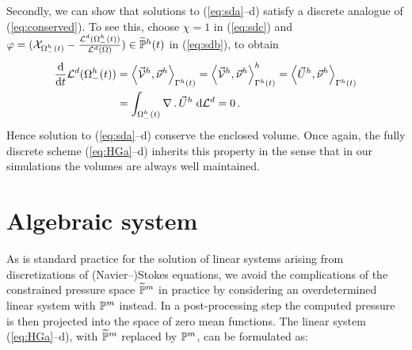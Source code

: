 Secondly, we can show that solutions to (\ref{eq:sda}--d) satisfy a discrete
analogue of (\ref{eq:conserved}). To see this, choose $\chi = 1$ in
(\ref{eq:sdc}) and $\varphi= (\mathrm{\mathcal{X}}_{\Omega_-^h(t)} -
\frac{\mathcal{L}^d(\Omega_-^h(t))}{\mathcal{L}^d(\Omega)})
\in \widetilde{\mathbb{P}}^h(t)$ in (\ref{eq:sdb}), to obtain
\begin{align}\label{eq:stokes_volume_semidiscrete}
\frac{\rm d}{{\rm d}t} \mathcal{L}^d(\Omega_-^h(t))  &=
\left\langle \vec{\mathcal{V}}^h , \vec\nu^h \right\rangle_{\Gamma^h(t)}
= \left\langle \vec{\mathcal{V}}^h , \vec\nu^h \right\rangle^h_{\Gamma^h(t)}
= \left\langle \vec U^h, \vec\nu^h \right\rangle_{\Gamma^h(t)} \\ &
= \int_{\Omega_-^h(t)} \nabla\,.\,\vec U^h \;{\rm d}{\cal L}^{d} =0\,.
\end{align}
Hence solution to (\ref{eq:sda}--d) conserve the enclosed volume. Once again,
the fully discrete scheme (\ref{eq:HGa}--d) inherits this property in the sense
that in our simulations the volumes are always well maintained.

\section{Algebraic system}\label{sec:stokes_algebraic_system}
As is standard practice for the solution of linear systems arising from
discretizations of (Navier--)Stokes equations, we avoid the complications of the
constrained pressure space $\widetilde{\mathbb{P}}^m$ in practice by considering an
overdetermined linear system with $\mathbb{P}^m$ instead.
In a post-processing step the computed pressure is
then projected into the space of zero mean functions. The linear system
(\ref{eq:HGa}--d), with $\widetilde{\mathbb{P}}^m$ replaced by $\mathbb{P}^m$, can be
formulated as:

